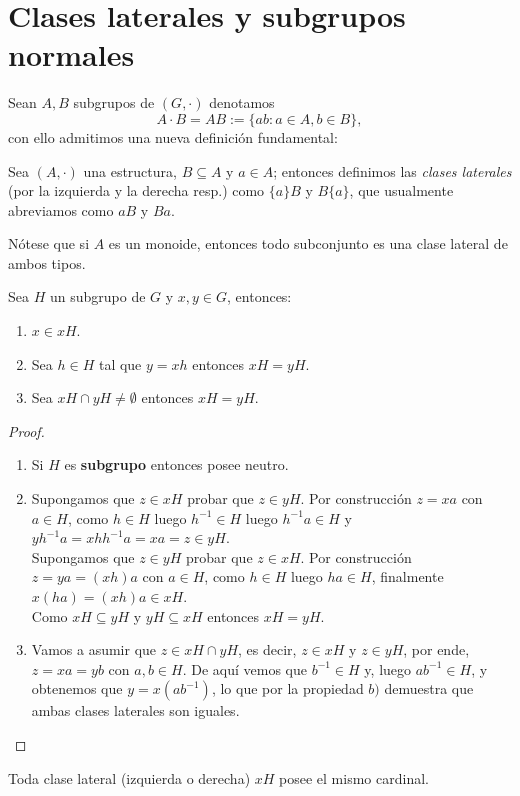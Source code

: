 \documentclass[11pt,oneside]{book}
\begin{document}
\section{Clases laterales y subgrupos normales}
Sean $A,B$ subgrupos de $(G,\cdot)$ denotamos
$$A\cdot B=AB:=\{ab:a\in A,b\in B\},$$
con ello admitimos una nueva definición fundamental:
\begin{mydef}
Sea $(A,\cdot)$ una estructura, $B\subseteq A$ y $a\in A$; entonces definimos las \textit{clases laterales} (por la izquierda y la derecha resp.) como $\{a\}B$ y $B\{a\}$, que usualmente abreviamos como $aB$ y $Ba$.
\end{mydef}
Nótese que si $A$ es un monoide, entonces todo subconjunto es una clase lateral de ambos tipos.
\begin{lem}\label{thm:left-coset}
Sea $H$ un subgrupo de $G$ y $x,y\in G$, entonces:
\begin{enumerate}[$a)$]
\item $x\in xH$.
\item Sea $h\in H$ tal que $y=xh$ entonces $xH=yH$.
\item Sea $xH\cap yH\neq\emptyset$ entonces $xH=yH$.
\end{enumerate}
\end{lem}
\begin{proof}
\begin{enumerate}[$a)$]
	\item Si $H$ es \textbf{subgrupo} entonces posee neutro.
	\item Supongamos que $z\in xH$ probar que $z\in yH$. Por construcción $z=xa$ con $a\in H$, como $h\in H$ luego $h^{-1}\in H$ luego $h^{-1}a\in H$ y $yh^{-1}a=xhh^{-1}a=xa=z\in yH$.\\
	Supongamos que $z\in yH$ probar que $z\in xH$. Por construcción $z=ya=(xh)a$ con $a\in H$, como $h\in H$ luego $ha\in H$, finalmente $x(ha)=(xh)a\in xH$.\\
	Como $xH\subseteq yH$ y $yH\subseteq xH$ entonces $xH=yH$.
	\item Vamos a asumir que $z\in xH\cap yH$, es decir, $z\in xH$ y $z\in yH$, por ende, $z=xa=yb$ con $a,b\in H$. De aquí vemos que $b^{-1}\in H$ y, luego $ab^{-1}\in H$, y obtenemos que $y=x(ab^{-1})$, lo que por la propiedad $b)$ demuestra que ambas clases laterales son iguales.
\end{enumerate}
\end{proof}
\begin{lem}
Toda clase lateral (izquierda o derecha) $xH$ posee el mismo cardinal.
\end{lem}
\end{document}
